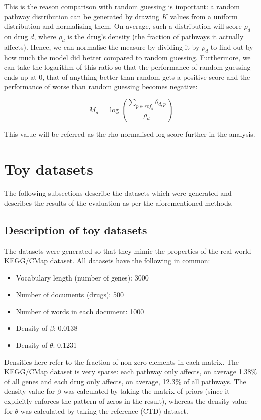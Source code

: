 \documentclass[12pt,a4paper,twoside,openright]{report}
\begin{document}
This is the reason comparison with random guessing is important: a random pathway distribution can be generated by drawing $K$ values from a uniform distribution and normalising them. On average, such a distribution will score $\rho_d$ on drug $d$, where $\rho_d$ is the drug's density (the fraction of pathways it actually affects). Hence, we can normalise the measure by dividing it by $\rho_d$ to find out by how much the model did better compared to random guessing. Furthermore, we can take the logarithm of this ratio so that the performance of random guessing ends up at 0, that of anything better than random gets a positive score and the performance of worse than random guessing becomes negative:

\begin{equation}\label{eq:rho-normalised-score}
M_d = \log(\frac{\sum\limits_{p \in \mathit{ref}_d}{\theta_{d, p}}}{\rho_d})
\end{equation}

This value will be referred as the rho-normalised log score further in the analysis.

\section{Toy datasets}

The following subsections describe the datasets which were generated and describes the results of the evaluation as per the aforementioned methods.

\subsection{Description of toy datasets}

The datasets were generated so that they mimic the properties of the real world KEGG/CMap dataset. All datasets have the following in common:

\begin{itemize}[noitemsep]
\item Vocabulary length (number of genes): 3000
\item Number of documents (drugs): 500
\item Number of words in each document: 1000
\item Density of $\beta$: 0.0138
\item Density of $\theta$: 0.1231
\end{itemize}

Densities here refer to the fraction of non-zero elements in each matrix. The KEGG/CMap dataset is very sparse: each pathway only affects, on average 1.38\% of all genes and each drug only affects, on average, 12.3\% of all pathways. The density value for $\beta$ was calculated by taking the matrix of priors (since it explicitly enforces the pattern of zeros in the result), whereas the density value for $\theta$ was calculated by taking the reference (CTD) dataset.
\end{document}
